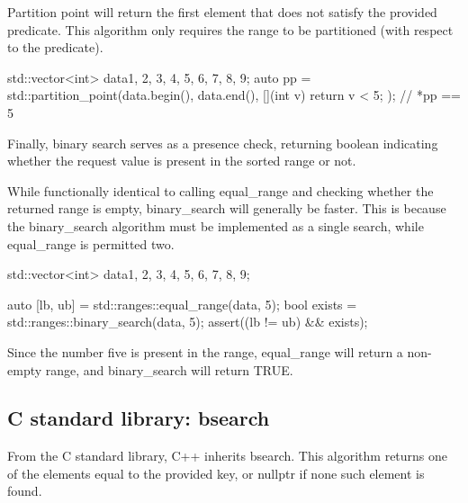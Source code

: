 

Partition point will return the first element that does not satisfy the provided predicate. This algorithm only requires the range to be partitioned (with respect to the predicate).

\begin{box-note}
\begin{cppcode}
std::vector<int> data{1, 2, 3, 4, 5, 6, 7, 8, 9};
auto pp = std::partition_point(data.begin(), data.end(), 
                                [](int v) { return v < 5; });
// *pp == 5
\end{cppcode}
\end{box-note}

Finally, binary search serves as a presence check, returning boolean indicating whether the request value is present in the sorted range or not.



While functionally identical to calling equal\_range and checking whether the returned range is empty, binary\_search will generally be faster. This is because the binary\_search algorithm must be implemented as a single search, while equal\_range is permitted two.

\begin{box-note}
\begin{cppcode}
std::vector<int> data{1, 2, 3, 4, 5, 6, 7, 8, 9};

auto [lb, ub] = std::ranges::equal_range(data, 5);
bool exists = std::ranges::binary_search(data, 5);
assert((lb != ub) && exists);
\end{cppcode}
\end{box-note}

Since the number five is present in the range, equal\_range will return a non-empty range, and binary\_search will return TRUE.

\subsection{C standard library: bsearch}

From the C standard library, C++ inherits bsearch. This algorithm returns one of the elements equal to the provided key, or nullptr if none such element is found.

